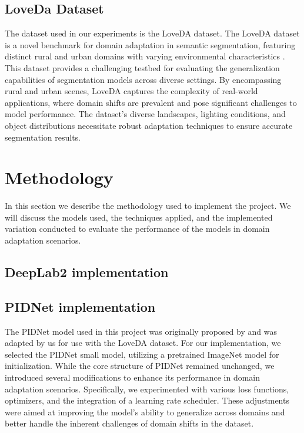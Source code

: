 \documentclass[10pt,twocolumn,letterpaper]{article}
\begin{document}
\subsection{LoveDa Dataset}

The dataset used in our experiments is the LoveDA dataset. The LoveDA dataset is a novel benchmark for domain adaptation in semantic segmentation, featuring distinct rural and urban domains with varying environmental characteristics \cite{wang2021loveda}. This dataset provides a challenging testbed for evaluating the generalization capabilities of segmentation models across diverse settings. By encompassing rural and urban scenes, LoveDA captures the complexity of real-world applications, where domain shifts are prevalent and pose significant challenges to model performance. The dataset's diverse landscapes, lighting conditions, and object distributions necessitate robust adaptation techniques to ensure accurate segmentation results.

\section{Methodology}
\label{sec:methodology}

In this section we describe the methodology used to implement the project. We will discuss the models used, the techniques applied, and the implemented variation conducted to evaluate the performance of the models in domain adaptation scenarios.

\subsection{DeepLab2 implementation}

\subsection{PIDNet implementation}

The PIDNet model used in this project was originally proposed by \cite{feng2021pidnet} and was adapted by us for use with the LoveDA dataset. For our implementation, we selected the PIDNet small model, utilizing a pretrained ImageNet model for initialization. While the core structure of PIDNet remained unchanged, we introduced several modifications to enhance its performance in domain adaptation scenarios. Specifically, we experimented with various loss functions, optimizers, and the integration of a learning rate scheduler. These adjustments were aimed at improving the model's ability to generalize across domains and better handle the inherent challenges of domain shifts in the dataset.
\end{document}
